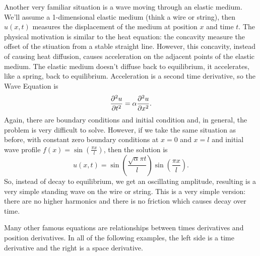 \documentclass[fleqn,letterpaper]{report}
\begin{document}
Another very familiar situation is a wave moving through an
elastic medium. We'll assume a 1-dimensional elastic medium
(think a wire or string), then $u(x,t)$ measures the
displacement of the medium at position $x$ and time $t$. The
physical motivation is similar to the heat equation: the
concavity measure the offset of the stiuation from a stable
straight line. However, this concavity, instead of causing
heat diffusion, causes acceleration on the adjacent points of
the elastic medium. The elastic medium doesn't diffuse back
to equilibrium, it accelerates, like a spring, back to
equilibrium. Acceleration is a second time derivative, so
the Wave Equation is
\begin{equation*}
\frac{\partial^2 u}{\partial t^2} = \alpha \frac{\partial^2 u}{\partial x^2}.
\end{equation*}
Again, there are boundary conditions and initial condition
and, in general, the problem is very difficult to solve.
However, if we take the same situation as before, with
constant zero boundary conditions at $x=0$ and $x=l$ and
initial wave profile $f(x) = \sin \left( \frac{ \pi x}{l}
\right)$, then the solution is
\begin{equation*}
u(x,t) = \sin \left( \frac{\sqrt{\alpha} \pi t}{l} \right)
\sin \left( \frac{\pi x}{l} \right).
\end{equation*}
So, instead of decay to equilibrium, we get an oscillating
amplitude, resulting is a very simple standing wave on the
wire or string. This is a very simple version: there are no
higher harmonics and there is no friction which causes decay
over time.

Many other famous equations are relationships between times
derivatives and position derivatives. In all of the following
examples, the left side is a time derivative and the right is
a space derivative.
\end{document}
